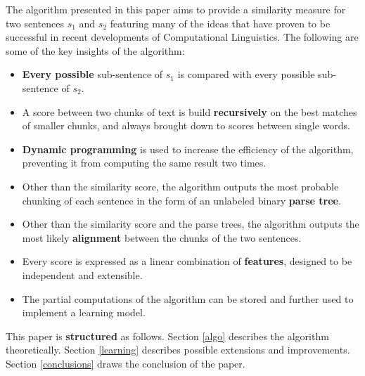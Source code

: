 
The algorithm presented in this paper aims to provide a similarity measure for two sentences $s_1$ and $s_2$ featuring many of the ideas that have proven to be successful in recent developments of Computational Linguistics. The following are some of the key insights of the algorithm:

\begin{itemize}
\item \textbf{Every possible} sub-sentence of $s_1$ is compared with every possible sub-sentence of $s_2$.
\item A score between two chunks of text is build \textbf{recursively} on the best matches of smaller chunks, and always brought down to scores between single words.
\item \textbf{Dynamic programming} is used to increase the efficiency of the algorithm, preventing it from computing the same result two times.
\item Other than the similarity score, the algorithm outputs the most probable chunking of each sentence in the form of an unlabeled binary \textbf{parse tree}.
\item Other than the similarity score and the parse trees, the algorithm outputs the most likely \textbf{alignment} between the chunks of the two sentences.
\item Every score is expressed as a linear combination of \textbf{features}, designed to be independent and extensible.
\item The partial computations of the algorithm can be stored and further used to implement a learning model.
\end{itemize}

This paper is \textbf{structured} as follows. Section \ref{algo} describes the algorithm theoretically. %
Section \ref{learning} describes possible extensions and improvements. Section \ref{conclusions} draws the conclusion of the paper.

